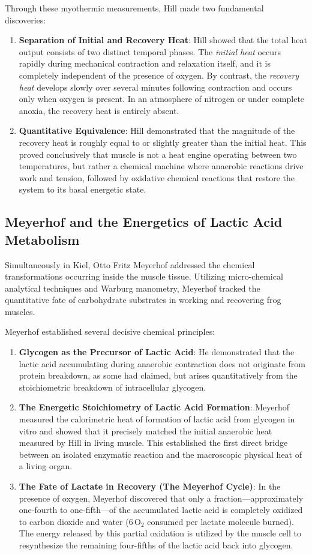 Through these myothermic measurements, Hill made two fundamental discoveries:
\begin{enumerate}
    \item \textbf{Separation of Initial and Recovery Heat}: Hill showed that the total heat output consists of two distinct temporal phases. The \emph{initial heat} occurs rapidly during mechanical contraction and relaxation itself, and it is completely independent of the presence of oxygen. By contrast, the \emph{recovery heat} develops slowly over several minutes following contraction and occurs only when oxygen is present. In an atmosphere of nitrogen or under complete anoxia, the recovery heat is entirely absent.
    \item \textbf{Quantitative Equivalence}: Hill demonstrated that the magnitude of the recovery heat is roughly equal to or slightly greater than the initial heat. This proved conclusively that muscle is not a heat engine operating between two temperatures, but rather a chemical machine where anaerobic reactions drive work and tension, followed by oxidative chemical reactions that restore the system to its basal energetic state.
\end{enumerate}

\subsection{Meyerhof and the Energetics of Lactic Acid Metabolism}

Simultaneously in Kiel, Otto Fritz Meyerhof addressed the chemical transformations occurring inside the muscle tissue. Utilizing micro-chemical analytical techniques and Warburg manometry, Meyerhof tracked the quantitative fate of carbohydrate substrates in working and recovering frog muscles.

Meyerhof established several decisive chemical principles:
\begin{enumerate}
    \item \textbf{Glycogen as the Precursor of Lactic Acid}: He demonstrated that the lactic acid accumulating during anaerobic contraction does not originate from protein breakdown, as some had claimed, but arises quantitatively from the stoichiometric breakdown of intracellular glycogen.
    \item \textbf{The Energetic Stoichiometry of Lactic Acid Formation}: Meyerhof measured the calorimetric heat of formation of lactic acid from glycogen in vitro and showed that it precisely matched the initial anaerobic heat measured by Hill in living muscle. This established the first direct bridge between an isolated enzymatic reaction and the macroscopic physical heat of a living organ.
    \item \textbf{The Fate of Lactate in Recovery (The Meyerhof Cycle)}: In the presence of oxygen, Meyerhof discovered that only a fraction—approximately one-fourth to one-fifth—of the accumulated lactic acid is completely oxidized to carbon dioxide and water ($6\,\text{O}_2$ consumed per lactate molecule burned). The energy released by this partial oxidation is utilized by the muscle cell to resynthesize the remaining four-fifths of the lactic acid back into glycogen.
\end{enumerate}

